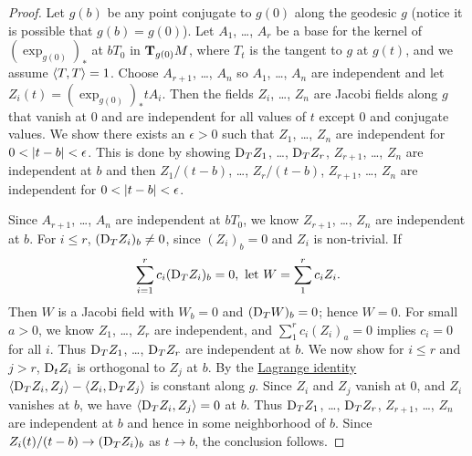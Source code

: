 \documentclass[../main]{subfiles}
\begin{document}
\begin{proof}
    Let $g(b)$ be any point conjugate to $g(0)$ along the geodesic $g$ (notice it is possible that $g(b) = g(0)$). Let $A_1$, \dots, $A_r$ be a base for the kernel of $(\exp_{g(0)})_\ast$ at $bT_0$ in $\tangentspace{M}{g(0)}$, where $T_t$ is the tangent to $g$ at $g(t)$, and we assume $\ip{T}{T} = 1$. Choose $A_{r+1}$, \dots, $A_n$ so $A_1$, \dots, $A_n$ are independent and let $Z_i(t) = (\exp_{g(0)})_\ast tA_i$. Then the fields $Z_i$, \dots, $Z_n$ are Jacobi fields along $g$ that vanish at $0$ and are independent for all values of $t$ except $0$ and conjugate values. We show there exists an $\epsilon > 0$ such that $Z_1$, \dots, $Z_n$ are independent for $0 < \norm{t- b} < \epsilon$. This is done by showing $\connection_T Z_1$, \dots, $\connection_T Z_r$, $Z_{r+1}$, \dots, $Z_n$ are independent at $b$ and then $Z_1/(t-b)$, \dots, $Z_r/(t-b)$, $Z_{r+1}$, \dots, $Z_n$ are independent for $0 < \norm{t - b} < \epsilon$.

    Since $A_{r+1}$, \dots, $A_n$ are independent at $bT_0$, we know $Z_{r+1}$, \dots, $Z_n$ are independent at $b$. For $i \leq r$, $(\connection_T Z_i)_b \ne 0$, since $(Z_i)_b = 0$ and $Z_i$ is non-trivial. If \[\sum_{i=1}^r c_i (\connection_T Z_i)_b = 0,\text{ let } W = \sum_1^r c_i Z_i.\] Then $W$ is a Jacobi field with $W_b = 0$ and $(\connection_T W)_b = 0$; hence $W = 0$. For small $a > 0$, we know $Z_1$, \dots, $Z_r$ are independent, and $\sum_1^r c_i (Z_i)_a = 0$ implies $c_i = 0$ for all $i$. Thus $\connection_T Z_1$, \dots, $\connection_T Z_r$ are independent at $b$. We now show for $i \leq r$ and $j > r$, $\connection_t Z_i$ is orthogonal to $Z_j$ at $b$. By the \hyperref[lem:ch10.2.8]{Lagrange identity} $\ip{\connection_T Z_i}{Z_j} - \ip{Z_i}{\connection_T Z_j}$ is constant along $g$. Since $Z_i$ and $Z_j$ vanish at $0$, and $Z_i$ vanishes at $b$, we have $\ip{\connection_T Z_i}{Z_j} = 0$ at $b$. Thus $\connection_T Z_1$, \dots, $\connection_T Z_r$, $Z_{r+1}$, \dots, $Z_n$ are independent at $b$ and hence in some neighborhood of $b$. Since $Z_i(t)/(t-b) \to (\connection_T Z_i)_b$ as $t \to b$, the conclusion follows.
\end{proof}
\end{document}
